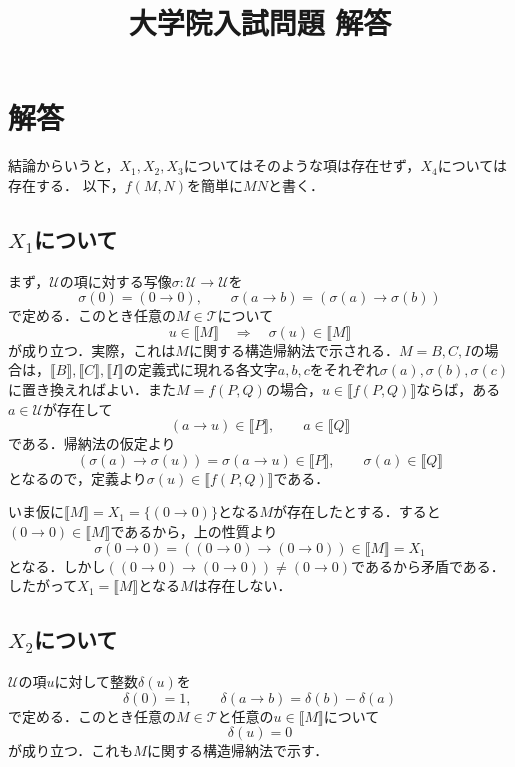 \documentclass{jsarticle}
\title{大学院入試問題 解答}
\author{}
\date{}
\begin{document}
\maketitle

\section*{解答}

結論からいうと，$X_1,X_2,X_3$についてはそのような項は存在せず，$X_4$については存在する．
以下，$f(M,N)$を簡単に$MN$と書く．

\subsection*{$X_1$について}

まず，$\mathcal U$の項に対する写像$\sigma:\mathcal U\to\mathcal U$を
\[
  \sigma(0)=(0\to 0),\qquad
  \sigma(a\to b)=(\sigma(a)\to \sigma(b))
\]
で定める．このとき任意の$M\in\mathcal T$について
\[
  u\in \llbracket M\rrbracket \quad\Longrightarrow\quad
  \sigma(u)\in \llbracket M\rrbracket
\]
が成り立つ．実際，これは$M$に関する構造帰納法で示される．$M=B,C,I$の場合は，$\llbracket B\rrbracket,\llbracket C\rrbracket,\llbracket I\rrbracket$の定義式に現れる各文字$a,b,c$をそれぞれ$\sigma(a),\sigma(b),\sigma(c)$に置き換えればよい．また$M=f(P,Q)$の場合，$u\in\llbracket f(P,Q)\rrbracket$ならば，ある$a\in\mathcal U$が存在して
\[
  (a\to u)
  \in\llbracket P\rrbracket,
  \qquad
  a\in\llbracket Q\rrbracket
\]
である．帰納法の仮定より
\[
  (\sigma(a)\to\sigma(u))=\sigma(a\to u)
  \in\llbracket P\rrbracket,
  \qquad
  \sigma(a)
  \in\llbracket Q\rrbracket
\]
となるので，定義より$\sigma(u)\in\llbracket f(P,Q)\rrbracket$である．

いま仮に$\llbracket M\rrbracket=X_1=\{(0\to 0)\}$となる$M$が存在したとする．すると$(0\to 0)\in\llbracket M\rrbracket$であるから，上の性質より
\[
  \sigma(0\to0)=((0\to0)\to(0\to0))
  \in\llbracket M\rrbracket=X_1
\]
となる．しかし$((0\to0)\to(0\to0))\ne(0\to0)$であるから矛盾である．したがって$X_1=\llbracket M\rrbracket$となる$M$は存在しない．

\subsection*{$X_2$について}

$\mathcal U$の項$u$に対して整数$\delta(u)$を
\[
  \delta(0)=1,
  \qquad
  \delta(a\to b)=\delta(b)-\delta(a)
\]
で定める．このとき任意の$M\in\mathcal T$と任意の$u\in\llbracket M\rrbracket$について
\[
  \delta(u)=0
\tag{1}
\]
が成り立つ．これも$M$に関する構造帰納法で示す．
\end{document}
